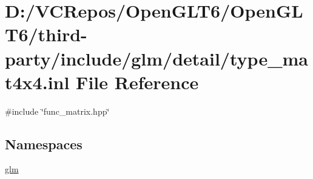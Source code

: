 \hypertarget{type__mat4x4_8inl}{}\section{D\+:/\+V\+C\+Repos/\+Open\+G\+L\+T6/\+Open\+G\+L\+T6/third-\/party/include/glm/detail/type\+\_\+mat4x4.inl File Reference}
\label{type__mat4x4_8inl}
{\ttfamily \#include \char`\"{}func\+\_\+matrix.\+hpp\char`\"{}}\newline
\subsection*{Namespaces}
\begin{DoxyCompactItemize}
\item 
 \mbox{\hyperlink{namespaceglm}{glm}}
\end{DoxyCompactItemize}
